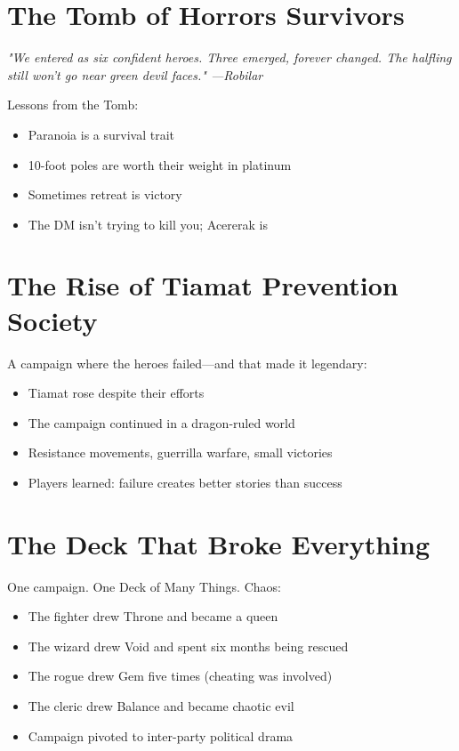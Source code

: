\documentclass[11pt,letterpaper,openany]{book}
\newcommand{\fantasyquote}[1]{%
\begin{center}
\textit{\large #1}
\end{center}
}
\begin{document}
\section{The Tomb of Horrors Survivors}

\fantasyquote{"We entered as six confident heroes. Three emerged, forever changed. The halfling still won't go near green devil faces." —Robilar}

Lessons from the Tomb:
\begin{itemize}
    \item Paranoia is a survival trait
    \item 10-foot poles are worth their weight in platinum
    \item Sometimes retreat is victory
    \item The DM isn't trying to kill you; Acererak is
\end{itemize}

\section{The Rise of Tiamat Prevention Society}

A campaign where the heroes failed—and that made it legendary:
\begin{itemize}
    \item Tiamat rose despite their efforts
    \item The campaign continued in a dragon-ruled world
    \item Resistance movements, guerrilla warfare, small victories
    \item Players learned: failure creates better stories than success
\end{itemize}

\section{The Deck That Broke Everything}

One campaign. One Deck of Many Things. Chaos:
\begin{itemize}
    \item The fighter drew Throne and became a queen
    \item The wizard drew Void and spent six months being rescued
    \item The rogue drew Gem five times (cheating was involved)
    \item The cleric drew Balance and became chaotic evil
    \item Campaign pivoted to inter-party political drama
\end{itemize}
\end{document}
